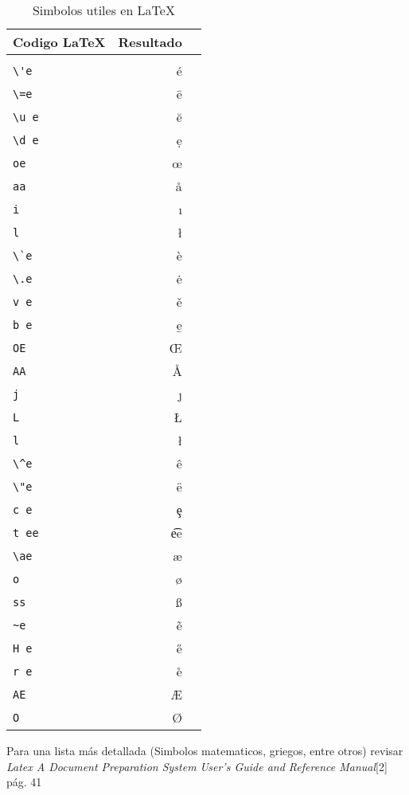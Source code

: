 \documentclass[10pt,journal,compsoc]{IEEEtran}
\begin{document}
\begin{table}
		\centering
		\caption{Simbolos utiles en \LaTeX}
		\begin{tabular}{ l r r }
			Codigo \LaTeX & Resultado \\
			\hline\\
			 \verb|\'e| & \'e \\
			 \verb|\=e| & \=e \\
			 \verb|\u e|& \u e\\
			 \verb|\d e|& \d e \\
			 \verb|oe| & \oe \\
			 \verb|aa| & \aa \\
			 \verb|i| & \i \\
			 \verb|l| & \l \\
			 \verb|\`e| & \`e \\
			 \verb|\.e| & \.e \\
			 \verb|v e| & \v e \\
			 \verb|b e| & \b e \\
			 \verb|OE| & \OE \\
			 \verb|AA| & \AA \\
			 \verb|j| & \j \\
			 \verb|L| & \L \\
			 \verb|l| & \l \\
			 \verb|\^e| & \^e \\
			 \verb|\"e| & \"e \\
			 \verb|c e| & \c e \\
			 \verb|t ee|& \t ee \\
			 \verb|\ae| & \ae \\
			 \verb|o| & \o \\
			 \verb|ss| & \ss \\
			 \verb|~e| & \~e \\
			 \verb|H e| & \H e \\
			 \verb|r e| & \r e \\
			 \verb|AE| & \AE \\
			 \verb|O|& \O \\
		\end{tabular}
	\hfill
\end{table}
Para una lista m\'as detallada (Simbolos matematicos, griegos, entre otros) revisar \emph{Latex A Document Preparation System User's Guide and Reference Manual}[2] pág. 41
\end{document}
